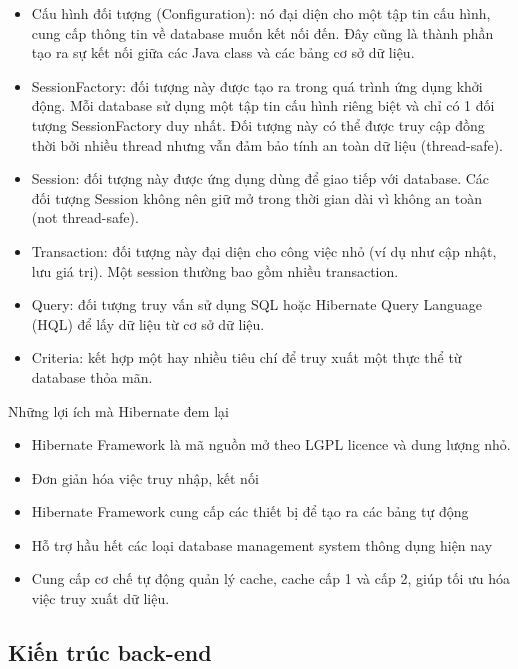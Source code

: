 \documentclass[12pt,a4paper,oneside]{extbook}
\begin{document}
\begin{itemize}[topsep=1mm,itemsep=-0.5mm]
\item Cấu hình đối tượng (Configuration): nó đại diện cho một tập tin cấu hình, cung cấp thông tin về database muốn kết nối đến. Đây cũng là thành phần tạo ra sự kết nối giữa các Java class và các bảng cơ sở dữ liệu.
\item SessionFactory: đối tượng này được tạo ra trong quá trình ứng dụng khởi động. Mỗi database sử dụng một tập tin cấu hình riêng biệt và chỉ có 1 đối tượng SessionFactory duy nhất. Đối tượng này có thể được truy cập đồng thời bởi nhiều thread nhưng vẫn đảm bảo tính an toàn dữ liệu (thread-safe).
\item Session: đối tượng này được ứng dụng dùng để giao tiếp với database. Các đối tượng Session không nên giữ mở trong thời gian dài vì không an toàn (not thread-safe).
\item Transaction: đối tượng này đại diện cho công việc nhỏ (ví dụ như cập nhật, lưu giá trị). Một session thường bao gồm nhiều transaction.
\item Query: đối tượng truy vấn sử dụng SQL hoặc Hibernate Query Language (HQL) để lấy dữ liệu từ cơ sở dữ liệu.
\item Criteria: kết hợp một hay nhiều tiêu chí để truy xuất một thực thể từ database thỏa mãn.
\vspace{1mm}
\end{itemize}

Những lợi ích mà Hibernate đem lại

\begin{itemize}[topsep=1mm,itemsep=-0.5mm]
\item Hibernate Framework là mã nguồn mở theo LGPL licence và dung lượng nhỏ.
\item Đơn giản hóa việc truy nhập, kết nối
\item Hibernate Framework cung cấp các thiết bị để tạo ra các bảng tự động
\item Hỗ trợ hầu hết các loại database management system thông dụng hiện nay
\item Cung cấp cơ chế tự động quản lý cache, cache cấp 1 và cấp 2, giúp tối ưu hóa việc truy xuất dữ liệu.
\vspace{1mm}
\end{itemize}

\subsection{Kiến trúc back-end}
\end{document}
